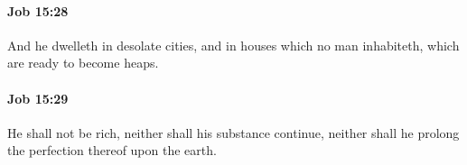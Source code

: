 		\paragraph{Job 15:28} %
			\label{JOB-15-28}

			And he dwelleth in desolate cities, and in houses which no man inhabiteth, which are ready to become heaps.


		\paragraph{Job 15:29} %
			\label{JOB-15-29}

			He shall not be rich, neither shall his substance continue, neither shall he prolong the perfection thereof upon the earth.


